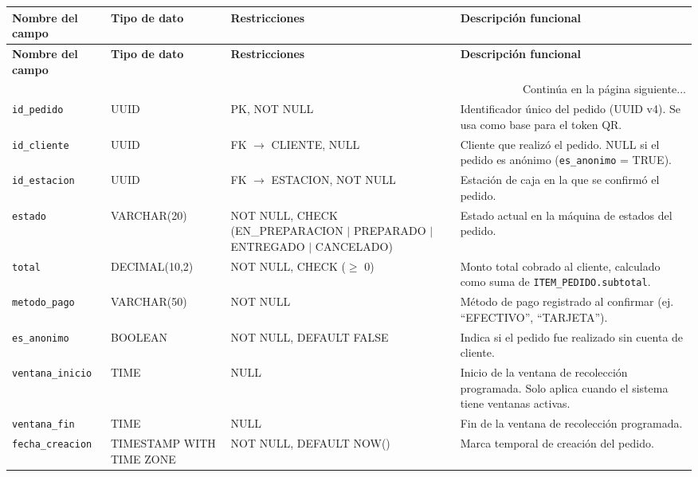 \begin{tabularx}{\textwidth}{p{3cm} p{2.5cm} p{3.5cm} X}
\caption{Tabla PEDIDO de la base de datos} \label{tab:pedido}\\
\toprule
\textbf{Nombre del campo} & \textbf{Tipo de dato} & \textbf{Restricciones} & \textbf{Descripción funcional} \\
\midrule
\endfirsthead

\toprule
\textbf{Nombre del campo} & \textbf{Tipo de dato} & \textbf{Restricciones} & \textbf{Descripción funcional} \\
\midrule
\endhead

\midrule
\multicolumn{4}{r}{\small Continúa en la página siguiente...} \\
\endfoot
\bottomrule
\endlastfoot

\texttt{id\_pedido} & UUID & PK, NOT NULL & Identificador único del pedido (UUID v4). Se usa como base para el token QR. \\
\addlinespace
\texttt{id\_cliente} & UUID & FK $\rightarrow$ CLIENTE, NULL & Cliente que realizó el pedido. NULL si el pedido es anónimo (\texttt{es\_anonimo} = TRUE). \\
\addlinespace
\texttt{id\_estacion} & UUID & FK $\rightarrow$ ESTACION, NOT NULL & Estación de caja en la que se confirmó el pedido. \\
\addlinespace
\texttt{estado} & VARCHAR(20) & NOT NULL, CHECK (EN\_PREPARACION  $|$  PREPARADO  $|$  ENTREGADO  $|$  CANCELADO) & Estado actual en la máquina de estados del pedido. \\
\addlinespace
\texttt{total} & DECIMAL(10,2) & NOT NULL, CHECK ($\ge$ 0) & Monto total cobrado al cliente, calculado como suma de \texttt{ITEM\_PEDIDO.subtotal}. \\
\addlinespace
\texttt{metodo\_pago} & VARCHAR(50) & NOT NULL & Método de pago registrado al confirmar (ej. ``EFECTIVO'', ``TARJETA''). \\
\addlinespace
\texttt{es\_anonimo} & BOOLEAN & NOT NULL, DEFAULT FALSE & Indica si el pedido fue realizado sin cuenta de cliente. \\
\addlinespace
\texttt{ventana\_inicio} & TIME & NULL & Inicio de la ventana de recolección programada. Solo aplica cuando el sistema tiene ventanas activas. \\
\addlinespace
\texttt{ventana\_fin} & TIME & NULL & Fin de la ventana de recolección programada. \\
\addlinespace
\texttt{fecha\_creacion} & TIMESTAMP WITH TIME ZONE & NOT NULL, DEFAULT NOW() & Marca temporal de creación del pedido. \\
\end{tabularx}
\endgroup

